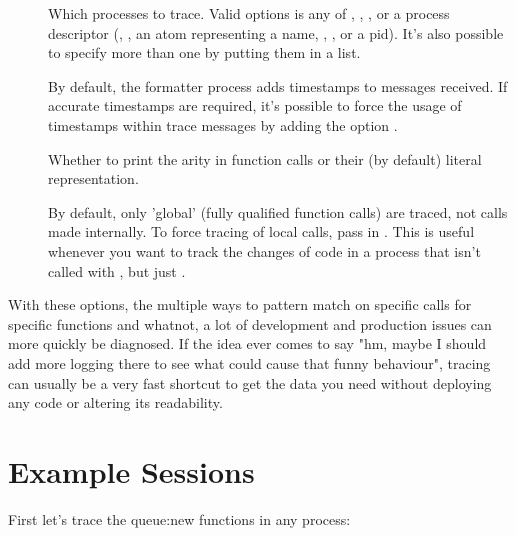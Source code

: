 \begin{description}
	\item[] \hfill
	
		Which processes to trace. Valid options is any of , , , or a process descriptor (, , an atom representing a name, , , or a pid). It's also possible to specify more than one by putting them in a list.
		
	\item[] \hfill
	
		By default, the formatter process adds timestamps to messages received. If accurate timestamps are required, it's possible to force the usage of timestamps within trace messages by adding the option .
		
	\item[] \hfill
	
		Whether to print the arity in function calls or their (by default) literal representation.
		
 	\item[] \hfill
	
		By default, only 'global' (fully qualified function calls) are traced, not calls made internally. To force tracing of local calls, pass in . This is useful whenever you want to track the changes of code in a process that isn't called with , but just .
\end{description}

With these options, the multiple ways to pattern match on specific calls for specific functions and whatnot, a lot of development and production issues can more quickly be diagnosed. If the idea ever comes to say "hm, maybe I should add more logging there to see what could cause that funny behaviour", tracing can usually be a very fast shortcut to get the data you need without deploying any code or altering its readability.


\section{Example Sessions}

First let's trace the queue:new functions in any process:

